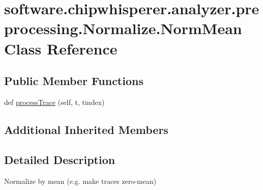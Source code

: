 \hypertarget{classsoftware_1_1chipwhisperer_1_1analyzer_1_1preprocessing_1_1Normalize_1_1NormMean}{}\section{software.\+chipwhisperer.\+analyzer.\+preprocessing.\+Normalize.\+Norm\+Mean Class Reference}
\label{classsoftware_1_1chipwhisperer_1_1analyzer_1_1preprocessing_1_1Normalize_1_1NormMean}
\subsection*{Public Member Functions}
\begin{DoxyCompactItemize}
\item 
def \hyperlink{classsoftware_1_1chipwhisperer_1_1analyzer_1_1preprocessing_1_1Normalize_1_1NormMean_a2243a8ca5a35771f2eb4005bb76c26e8}{process\+Trace} (self, t, tindex)
\end{DoxyCompactItemize}
\subsection*{Additional Inherited Members}


\subsection{Detailed Description}
\begin{DoxyVerb}Normalize by mean (e.g. make traces zero-mean)\end{DoxyVerb}
 

